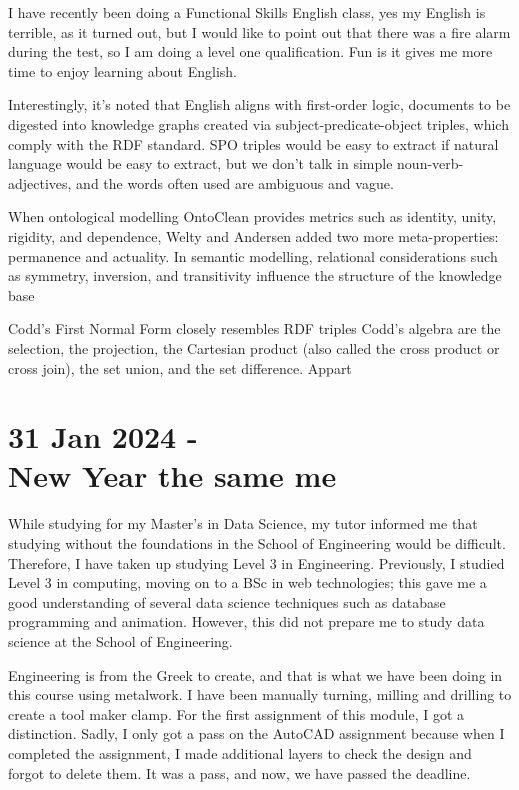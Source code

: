 \documentclass{article}
\begin{document}
I have recently been doing a Functional Skills English class, yes my English is terrible, as it turned out, but I would like to point out that there was a fire alarm during the test, so I am doing a level one qualification. Fun is it gives me more time to enjoy learning about English. 

Interestingly, it's noted that English aligns with first-order logic, documents to be digested into knowledge graphs created via subject-predicate-object triples, which comply with the RDF standard. SPO triples would be easy to extract if natural language would be easy to extract, but we don't talk in simple noun-verb-adjectives, and the words often used are ambiguous and vague.


 When ontological modelling OntoClean provides metrics such as identity, unity, rigidity, and dependence, Welty and Andersen added two more meta-properties: permanence and actuality.
In semantic modelling, relational considerations such as symmetry, inversion, and transitivity influence the structure of the knowledge base 


Codd's First Normal Form closely resembles RDF triples
Codd's algebra are the selection, the projection, the Cartesian product (also called the cross product or cross join), the set union, and the set difference.
Appart 



\section*{31 Jan 2024 - \\ New Year the same me}

While studying for my Master's in Data Science, my tutor informed me that studying without the foundations in the School of Engineering would be difficult. Therefore, I have taken up studying Level 3 in Engineering. Previously, I studied Level 3 in computing, moving on to a BSc in web technologies; this gave me a good understanding of several data science techniques such as database programming and animation. However, this did not prepare me to study data science at the School of Engineering.

Engineering is from the Greek to create, and that is what we have been doing in this course using metalwork. I have been manually turning, milling and drilling to create a tool maker clamp. For the first assignment of this module, I got a distinction. Sadly, I only got a pass on the AutoCAD assignment because when I completed the assignment, I made additional layers to check the design and forgot to delete them. It was a pass, and now, we have passed the deadline. 
\end{document}
